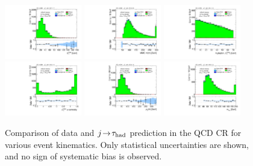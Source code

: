 \begin{figure}[tp]
  \includegraphics[width=0.30\textwidth]{figures/analysis/vbf-QCDCR/met-pt-hi}
  \includegraphics[width=0.30\textwidth]{figures/analysis/vbf-QCDCR/mMMC}
  \includegraphics[width=0.30\textwidth]{figures/analysis/vbf-QCDCR/mT} \\
  \includegraphics[width=0.30\textwidth]{figures/analysis/vbf-QCDCR/met-phi-centrality}
  \includegraphics[width=0.30\textwidth]{figures/analysis/vbf-QCDCR/H-pt-hi}
  \includegraphics[width=0.30\textwidth]{figures/analysis/vbf-QCDCR/mvis} \\
  \caption{Comparison of data and $j\!\rightarrow\!\tau_\text{had}$ prediction in the QCD CR for various event kinematics. Only statistical uncertainties are shown, and no sign of systematic bias is observed.}
  \label{fig:backgrounds-QCDCR-taus}
\end{figure}


